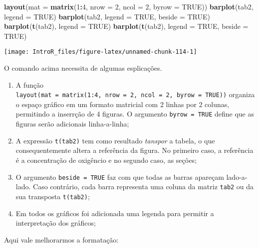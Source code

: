 \documentclass[
]{book}
\newenvironment{Shaded}{\begin{snugshade}}{\end{snugshade}}
\newcommand{\DataTypeTok}[1]{\textcolor[rgb]{0.13,0.29,0.53}{#1}}
\newcommand{\DecValTok}[1]{\textcolor[rgb]{0.00,0.00,0.81}{#1}}
\newcommand{\KeywordTok}[1]{\textcolor[rgb]{0.13,0.29,0.53}{\textbf{#1}}}
\newcommand{\NormalTok}[1]{#1}
\newcommand{\OperatorTok}[1]{\textcolor[rgb]{0.81,0.36,0.00}{\textbf{#1}}}
\newcommand{\OtherTok}[1]{\textcolor[rgb]{0.56,0.35,0.01}{#1}}
\begin{document}
\begin{Shaded}
\begin{Highlighting}[]
\KeywordTok{layout}\NormalTok{(}\DataTypeTok{mat =} \KeywordTok{matrix}\NormalTok{(}\DecValTok{1}\OperatorTok{:}\DecValTok{4}\NormalTok{, }\DataTypeTok{nrow =} \DecValTok{2}\NormalTok{, }\DataTypeTok{ncol =} \DecValTok{2}\NormalTok{, }\DataTypeTok{byrow =} \OtherTok{TRUE}\NormalTok{))}
\KeywordTok{barplot}\NormalTok{(tab2, }\DataTypeTok{legend =} \OtherTok{TRUE}\NormalTok{)}
\KeywordTok{barplot}\NormalTok{(tab2, }\DataTypeTok{legend =} \OtherTok{TRUE}\NormalTok{, }\DataTypeTok{beside =} \OtherTok{TRUE}\NormalTok{)}
\KeywordTok{barplot}\NormalTok{(}\KeywordTok{t}\NormalTok{(tab2), }\DataTypeTok{legend =} \OtherTok{TRUE}\NormalTok{)}
\KeywordTok{barplot}\NormalTok{(}\KeywordTok{t}\NormalTok{(tab2), }\DataTypeTok{legend =} \OtherTok{TRUE}\NormalTok{, }\DataTypeTok{beside =} \OtherTok{TRUE}\NormalTok{)}
\end{Highlighting}
\end{Shaded}

\begin{center}\texttt{[image: IntroR\_files/figure-latex/unnamed-chunk-114-1]} \end{center}

O comando acima necessita de algumas esplicações.

\begin{enumerate}
\def\labelenumi{\arabic{enumi}.}
\item
  A função \texttt{layout(mat\ =\ matrix(1:4,\ nrow\ =\ 2,\ ncol\ =\ 2,\ byrow\ =\ TRUE))} organiza o espaço gráfico em um formato matricial com 2 linhas por 2 colunas, permitindo a inserrção de 4 figuras. O argumento \texttt{byrow\ =\ TRUE} define que as figuras serão adicionais linha-a-linha;
\item
  A expressão \texttt{t(tab2)} tem como resultado \emph{tanspor} a tabela, o que consequentemente altera a referência da figura. No primeiro caso, a referência é a concentração de oxigêncio e no segundo caso, as seções;
\item
  O argumento \texttt{beside\ =\ TRUE} faz com que todas as barras apareçam lado-a-lado. Caso contrário, cada barra representa uma coluna da matriz \texttt{tab2} ou da sua transposta \texttt{t(tab2)};
\item
  Em todos os gráficos foi adicionada uma legenda para permitir a interpretação dos gráficos;
\end{enumerate}

Aqui vale melhorarmos a formatação:
\end{document}
